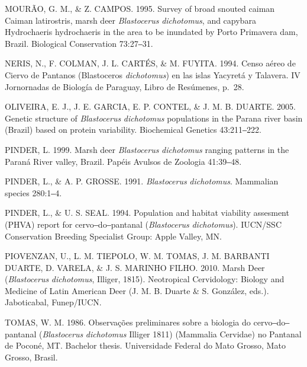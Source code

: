 \documentclass[
  x11names]{article}
\begin{document}
MOURÃO, G. M., \& Z. CAMPOS. 1995. Survey of broad snouted caiman Caiman
latirostris, marsh deer \textit{Blastocerus} \textit{dichotomus}, and
capybara Hydrochaeris hydrochaeris in the area to be inundated by Porto
Primavera dam, Brazil. Biological Conservation 73:27‒31.

NERIS, N., F. COLMAN, J. L. CARTÉS, \& M. FUYITA. 1994. Censo aéreo de
Ciervo de Pantanos (Blastoceros \textit{dichotomus}) en las islas
Yacyretá y Talavera. IV Jornornadas de Biología de Paraguay, Libro de
Resúmenes, p.~28.

OLIVEIRA, E. J., J. E. GARCIA, E. P. CONTEL, \& J. M. B. DUARTE. 2005.
Genetic structure of \textit{Blastocerus} \textit{dichotomus}
populations in the Parana river basin (Brazil) based on protein
variability. Biochemical Genetics 43:211‒222.

PINDER, L. 1999. Marsh deer \textit{Blastocerus} \textit{dichotomus}
ranging patterns in the Paraná River valley, Brazil. Papéis Avulsos de
Zoologia 41:39‒48.

PINDER, L., \& A. P. GROSSE. 1991. \textit{Blastocerus}
\textit{dichotomus}. Mammalian species 280:1‒4.

PINDER, L., \& U. S. SEAL. 1994. Population and habitat viability
assesment (PHVA) report for cervo‒do‒pantanal (\textit{Blastocerus}
\textit{dichotomus}). IUCN/SSC Conservation Breeding Specialist Group:
Apple Valley, MN.~

PIOVENZAN, U., L. M. TIEPOLO, W. M. TOMAS, J. M. BARBANTI DUARTE, D.
VARELA, \& J. S. MARINHO FILHO. 2010. Marsh Deer (\textit{Blastocerus}
\textit{dichotomus}, Illiger, 1815). Neotropical Cervidology: Biology
and Medicine of Latin American Deer (J. M. B. Duarte \& S. González,
eds.). Jaboticabal, Funep/IUCN.

TOMAS, W. M. 1986. Observações preliminares sobre a biologia do
cervo‒do‒pantanal (\textit{Blastocerus} \textit{dichotomus} Illiger
1811) (Mammalia Cervidae) no Pantanal de Poconé, MT. Bachelor thesis.
Universidade Federal do Mato Grosso, Mato Grosso, Brasil.

\setlength{\parindent}{0pt}

%
\begin{table}[H]
\centering
\begin{tabular}[t]{>{\raggedright\arraybackslash}m{16cm}>{}m{16cm}}
\toprule
\cellcolor{ceil}{\textcolor{white}{\textbf{\rule{0pt}{14pt}AUTORES}}}\\
\bottomrule
\end{tabular}
\end{table}
\end{document}
